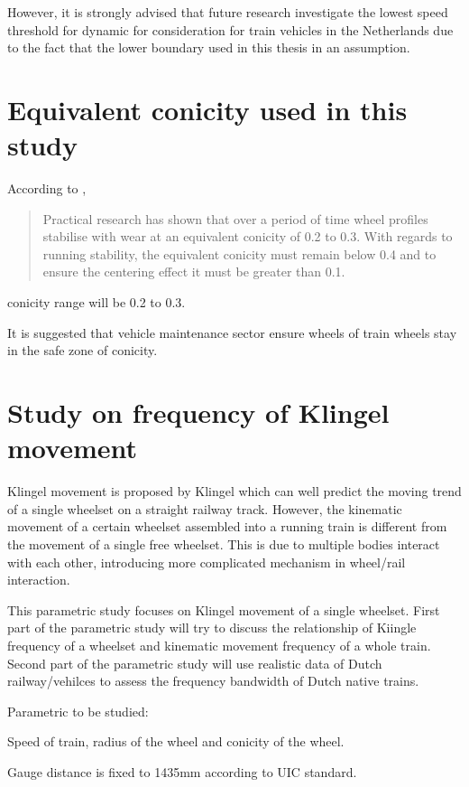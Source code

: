 However, it is strongly advised that future research investigate the lowest speed threshold for dynamic for consideration for train vehicles in the Netherlands due to the fact that the lower boundary used in this thesis in an assumption.

\section{Equivalent conicity used in this study}
According to \cite[Section.2.6]{esveld2001modern}, 

\begin{quote}
    Practical research has shown that over a period of time wheel profiles stabilise with wear at an equivalent conicity of 0.2 to 0.3. With regards to running stability, the equivalent conicity must remain below 0.4 and to ensure the centering effect it must be greater than 0.1.
\end{quote}

conicity range will be 0.2 to 0.3.

It is suggested that vehicle maintenance sector ensure wheels of train wheels stay in the safe zone of conicity. 


\section{Study on frequency of Klingel movement}

Klingel movement is proposed by Klingel which can well predict the moving trend of a single wheelset on a straight railway track. However, the kinematic movement of a certain wheelset assembled into a running train is different from the movement of a single free wheelset. This is due to multiple bodies interact with each other, introducing more complicated mechanism in wheel/rail interaction. 

This parametric study focuses on Klingel movement of a single wheelset. First part of the parametric study will try to discuss the relationship of Kiingle frequency of a wheelset and kinematic movement frequency of a whole train. Second part of the parametric study will use realistic data of Dutch railway/vehilces to assess the frequency bandwidth of Dutch native trains.

Parametric to be studied:

Speed of train, radius of the wheel and conicity of the wheel. 

Gauge distance is fixed to 1435mm according to UIC standard. 

